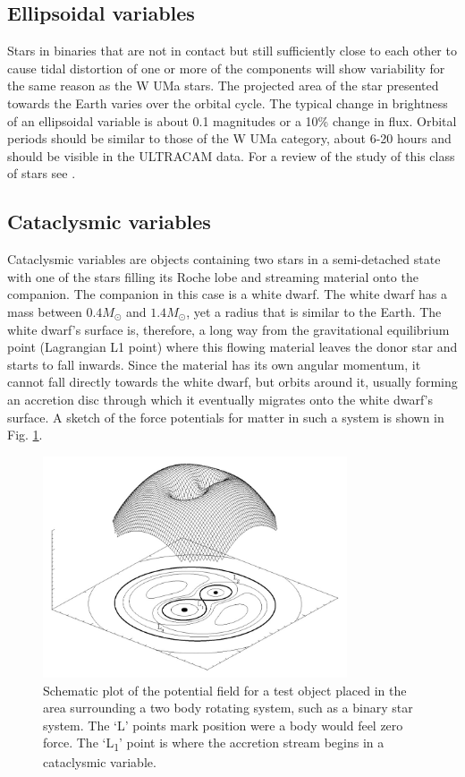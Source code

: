 \subsection{Ellipsoidal variables}
Stars in binaries that are not in contact but still sufficiently close to each other to cause tidal distortion of one or more of the components will show variability for the same reason as the {W UMa} stars. The projected area of the star presented towards the Earth varies over the orbital cycle. The typical change in brightness of an ellipsoidal variable is about 0.1 magnitudes or a 10\% change in flux. Orbital periods should be similar to those of the {W UMa} category, about 6-20 hours and should be visible in the ULTRACAM data. For a review of the study of this class of stars see \citet{EllipsoidalReview1985}.

\subsection{Cataclysmic variables}
Cataclysmic variables are objects containing two stars in a semi-detached state with one of the stars filling its Roche lobe and streaming material onto the companion. The companion in this case is a white dwarf. The white dwarf has a mass between $0.4 M_{\odot}$ and $1.4 M_{\odot}$, yet a radius that is similar to the Earth. The white dwarf's surface is, therefore, a long way from the gravitational equilibrium point (Lagrangian L1 point) where this flowing material leaves the donor star and starts to fall inwards. Since the material has its own angular momentum, it cannot fall directly towards the white dwarf, but orbits around it, usually forming an accretion disc through which it eventually migrates onto the white dwarf's surface. A sketch of the force potentials for matter in such a system is shown in Fig. \ref{fig:rochepotential}.

\begin{figure}
\centering
\includegraphics[width=90mm]{images/rochepotential.jpg}
\caption{Schematic plot of the potential field for a test object placed in the area surrounding a two body rotating system, such as a binary star system. The `L' points mark position were a body would feel zero force. The `L\textsubscript{1}' point is where the accretion stream begins in a cataclysmic variable.}
\label{fig:rochepotential}
\end{figure}

